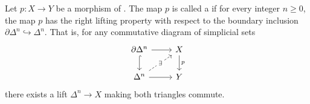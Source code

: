 \begin{definition} \label{definition:trivial_Kan_fibration_between_simplicial_sets}
Let $p : X \to Y$ be a morphism of . The map $p$ is called a  if for every integer $n \ge 0$, the map $p$ has the right lifting property with respect to the boundary inclusion $\partial\Delta^n \hookrightarrow \Delta^n$. That is, for any commutative diagram of simplicial sets
$$
\begin{tikzcd}
\partial\Delta^n \ar[r] \ar[d, hook] & X \ar[d, "p"] \\
\Delta^n \ar[r] \ar[ur, dashed, "\exists" description] & Y
\end{tikzcd}
$$
\TODO{$\partial$}
there exists a lift $\Delta^n \to X$ making both triangles commute.
\end{definition}
